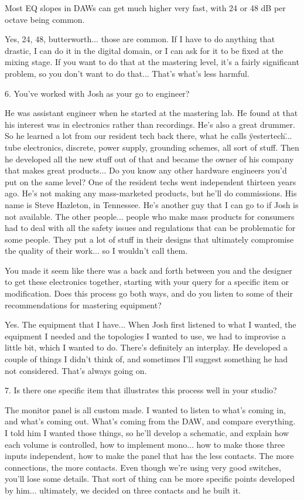 Most EQ slopes in DAWs can get much higher very fast, with 24 or 48 dB per octave being common.

Yes, 24, 48, butterworth... those are common. If I have to do anything that drastic, I can do it in the digital domain, or I can ask for it to be fixed at the mixing stage. If you want to do that at the mastering level, it's a fairly significant problem, so you don't want to do that... That's what's less harmful.

6. You've worked with Josh as your go to engineer?

He was assistant engineer when he started at the mastering lab. He found at that his interest was in electronics rather than recordings. He's also a great drummer. So he learned a lot from our resident tech back there, what he calls \"yestertech\"... tube electronics, discrete, power supply, grounding schemes, all sort of stuff. Then he developed all the new stuff out of that and became the owner of his company that makes great products...
Do you know any other hardware engineers you'd put on the same level?
One of the resident techs went independent thirteen years ago. He's not making any mass-marketed products, but he'll do commissions. His name is Steve Hazleton, in Tennessee. He's another guy that I can go to if Josh is not available. The other people... people who make mass products for consumers had to deal with all the safety issues and regulations that can be problematic for some people. They put a lot of stuff in their designs that ultimately compromise the quality of their work... so I wouldn't call them.

You made it seem like there was a back and forth between you and the designer to get these electronics together, starting with your query for a specific item or modification. Does this process go both ways, and do you listen to some of their recommendations for mastering equipment?

Yes. The equipment that I have... When Josh first listened to what I wanted, the equipment I needed and the topologies I wanted to use, we had to improvise a little bit, which I wanted to do. There's definitely an interplay. He developed a couple of things I didn't think of, and sometimes I'll suggest something he had not considered. That's always going on.

7. Is there one specific item that illustrates this process well in your studio?

The monitor panel is all custom made. I wanted to listen to what's coming in, and what's coming out. What's coming from the DAW, and compare everything. I told him I wanted those things, so he'll develop a schematic, and explain how each volume is controlled, how to implement mono... how to make those three inputs independent, how to make the panel that has the less contacts. The more connections, the more contacts. Even though we're using very good switches, you'll lose some details. That sort of thing can be more specific points developed by him... ultimately, we decided on three contacts and he built it.

